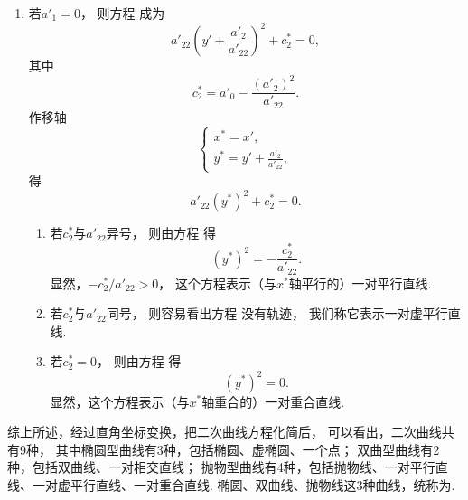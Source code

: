 \begin{enumerate}
\begin{enumerate}
		\item 若\(a'_1 = 0\)，
		则方程 
		成为\begin{equation*}
			a'_{22} \left( y' + \frac{a'_2}{a'_{22}} \right)^2
			+ c^*_2
			= 0,
		\end{equation*}
		其中\begin{equation*}
			c^*_2 = a'_0 - \frac{(a'_2)^2}{a'_{22}}.
		\end{equation*}
		作移轴\begin{equation*}
			\left\{ \begin{array}{l}
				x^* = x', \\
				y^* = y' + \frac{a'_2}{a'_{22}},
			\end{array} \right.
		\end{equation*}
		得\begin{equation}\label{equation:二次曲线方程的化简及其类型.先配方再移轴后所得方程}
			a'_{22} (y^*)^2 + c^*_2 = 0.
		\end{equation}
		\begin{enumerate}
			\item 若\(c^*_2\)与\(a'_{22}\)异号，
			则由方程 
			得\begin{equation}
				(y^*)^2 = -\frac{c^*_2}{a'_{22}}.
			\end{equation}
			显然，\(-c^*_2/a'_{22} > 0\)，
			这个方程表示（与\(x^*\)轴平行的）一对平行直线.

			\item 若\(c^*_2\)与\(a'_{22}\)同号，
			则容易看出方程  没有轨迹，
			我们称它表示一对虚平行直线.

			\item 若\(c^*_2 = 0\)，
			则由方程 
			得\begin{equation}
				(y^*)^2 = 0.
			\end{equation}
			显然，这个方程表示（与\(x^*\)轴重合的）一对重合直线.
		\end{enumerate}
	\end{enumerate}
\end{enumerate}
综上所述，经过直角坐标变换，把二次曲线方程化简后，
可以看出，二次曲线共有9种，
其中椭圆型曲线有3种，包括椭圆、虚椭圆、一个点；
双曲型曲线有2种，包括双曲线、一对相交直线；
抛物型曲线有4种，包括抛物线、一对平行直线、一对虚平行直线、一对重合直线.
椭圆、双曲线、抛物线这3种曲线，统称为.

